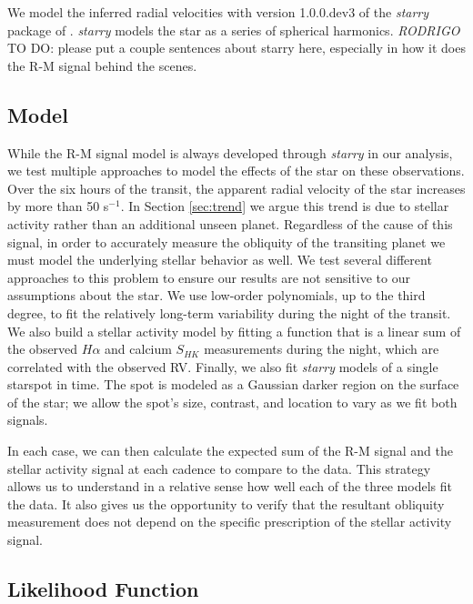 \documentclass[twocolumn]{aastex63}
\newcommand{\todo}[3]{{\color{#2} \emph{#1} TO DO: #3}}
\begin{document}
We model the inferred radial velocities with version 1.0.0.dev3 of the \textit{starry} package of \citet{Luger19}. 
\textit{starry} models the star as a series of spherical harmonics. 
\todo{RODRIGO}{red}{please put a couple sentences about starry here, especially in how it does the R-M signal behind the scenes.}


\subsection{Model}
\label{sec:model}

While the R-M signal model is always developed through \textit{starry} in our analysis, we test multiple approaches to model the effects of the star on these observations.
Over the six hours of the transit, the apparent radial velocity of the star increases by more than 50 s$^{-1}$. 
In Section \ref{sec:trend} we argue this trend is due to stellar activity rather than an additional unseen planet.
Regardless of the cause of this signal, in order to accurately measure the obliquity of the transiting planet we must model the underlying stellar behavior as well.
We test several different approaches to this problem to ensure our results are not sensitive to our assumptions about the star.
We use low-order polynomials, up to the third degree, to fit the relatively long-term variability during the night of the transit. 
We also build a stellar activity model by fitting a function that is a linear sum of the observed $H\alpha$ and calcium $S_{HK}$ measurements during the night, which are correlated with the observed RV.
Finally, we also fit \textit{starry} models of a single starspot in time. The spot is modeled as a Gaussian darker region on the surface of the star; we allow the spot's size, contrast, and location to vary as we fit both signals.

In each case, we can then calculate the expected sum of the R-M signal and the stellar activity signal at each cadence to compare to the data. 
This strategy allows us to understand in a relative sense how well each of the three models fit the data. 
It also gives us the opportunity to verify that the resultant obliquity measurement does not depend on the specific prescription of the stellar activity signal.




\subsection{Likelihood Function}
\end{document}
